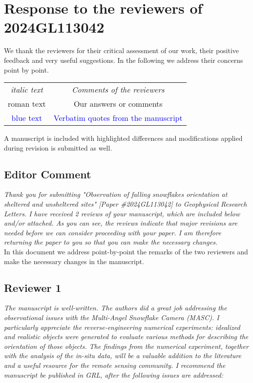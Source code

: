 \documentclass[12pt]{article}
\newcommand*{\blue}{\textcolor{blue}}
\begin{document}
\section*{Response to the reviewers of 2024GL113042 }

We thank the reviewers for their critical assessment of our work, their positive feedback and very useful suggestions. 
In the following we address their concerns point by point.\\

\noindent

\begin{table}[H]
\centering
\begin{tabular}{ |c|c| } 
 \hline
 {\itshape italic text  } & {\itshape Comments of the reviewers}  \\ 
 roman text               & Our answers or comments   \\ 
 \blue{blue text}         & \blue{Verbatim quotes from the manuscript}  \\ 
 \hline
\end{tabular}
\end{table}

\noindent
A manuscript is included with highlighted differences and modifications applied during revision is submitted as well. 


\subsection*{Editor Comment}
\textit{Thank you for submitting "Observation of falling snowflakes orientation at sheltered and unsheltered sites" [Paper \#2024GL113042] to Geophysical Research Letters. I have received 2 reviews of your manuscript, which are included below and/or attached. As you can see, the reviews indicate that major revisions are needed before we can consider proceeding with your paper. I am therefore returning the paper to you so that you can make the necessary changes.
}\\

\noindent
In this document we address point-by-point the remarks of the two reviewers and make the necessary changes in the manuscript. 

\newpage
\subsection*{Reviewer 1}

\textit{The manuscript is well-written. The authors did a great job addressing the observational issues with the Multi-Angel Snowflake Camera (MASC). I particularly appreciate the reverse-engineering numerical experiments: idealized and realistic objects were generated to evaluate various methods for describing the orientation of those objects. The findings from the numerical experiment, together with the analysis of the in-situ data, will be a valuable addition to the literature and a useful resource for the remote sensing community. I recommend the manuscript be published in GRL, after the following issues are addressed:}\\
\end{document}
